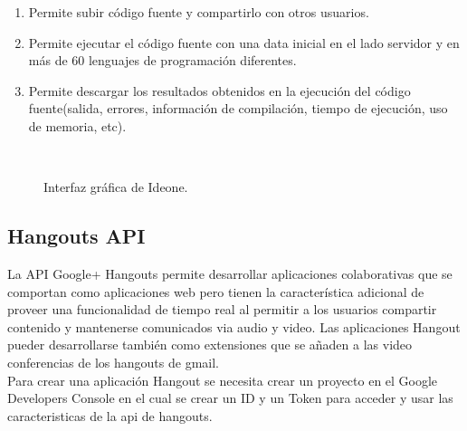 \begin{enumerate}
  \item Permite subir código fuente y compartirlo con otros usuarios.
  \item Permite ejecutar el código fuente con una data inicial en el lado servidor y en más de 60 lenguajes de programación diferentes.
  \item Permite descargar los resultados obtenidos en la ejecución del código fuente(salida, errores, información de compilación, tiempo de ejecución, uso de memoria, etc).
\end{enumerate}
\begin{figure}[h]
  \centering

  \caption[Ideone]{Interfaz gráfica de Ideone.}
    \\
  \label{fig:ideone}
\end{figure}

\subsection{Hangouts API}
La API Google+ Hangouts permite desarrollar aplicaciones colaborativas que se comportan como aplicaciones web pero tienen la característica adicional de proveer una funcionalidad de tiempo real al permitir a los usuarios compartir contenido y mantenerse comunicados via audio y video. Las aplicaciones Hangout pueder desarrollarse también como extensiones que se añaden a las video conferencias de los hangouts de gmail.\\

Para crear una aplicación Hangout se necesita crear un proyecto en el Google Developers Console en el cual se crear un ID y un Token para acceder y usar las caracteristicas de la api de hangouts.\\

